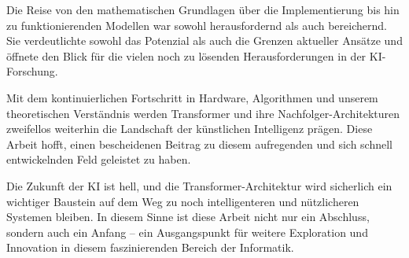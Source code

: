 Die Reise von den mathematischen Grundlagen über die Implementierung bis hin zu funktionierenden Modellen war sowohl herausfordernd als auch bereichernd. Sie verdeutlichte sowohl das Potenzial als auch die Grenzen aktueller Ansätze und öffnete den Blick für die vielen noch zu lösenden Herausforderungen in der KI-Forschung.

Mit dem kontinuierlichen Fortschritt in Hardware, Algorithmen und unserem theoretischen Verständnis werden Transformer und ihre Nachfolger-Architekturen zweifellos weiterhin die Landschaft der künstlichen Intelligenz prägen. Diese Arbeit hofft, einen bescheidenen Beitrag zu diesem aufregenden und sich schnell entwickelnden Feld geleistet zu haben.

Die Zukunft der KI ist hell, und die Transformer-Architektur wird sicherlich ein wichtiger Baustein auf dem Weg zu noch intelligenteren und nützlicheren Systemen bleiben. In diesem Sinne ist diese Arbeit nicht nur ein Abschluss, sondern auch ein Anfang – ein Ausgangspunkt für weitere Exploration und Innovation in diesem faszinierenden Bereich der Informatik.